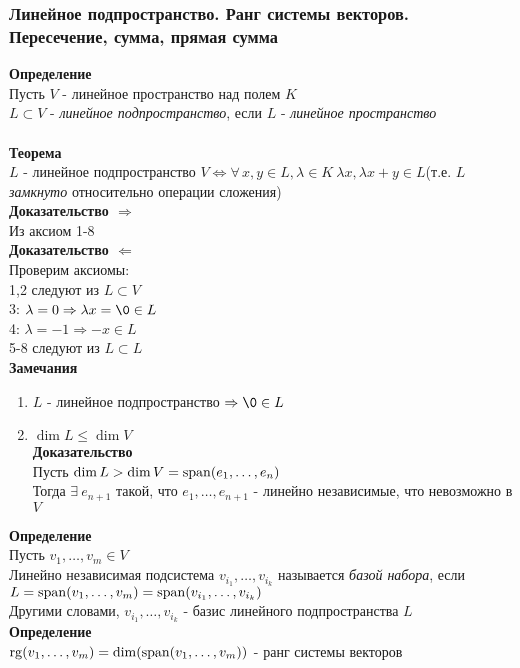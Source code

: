 \documentclass[12pt]{article}
\begin{document}
\subsubsection{Линейное подпространство. Ранг системы векторов. Пересечение, сумма, прямая сумма}
\textbf{Определение}\\
Пусть $V$ - линейное пространство над полем $K$\\
$L \subset V$ - \textit{линейное подпространство}, если $L$ - \textit{линейное пространство}\\\\
\textbf{Теорема}\\
$L$ - линейное подпространство $V \Leftrightarrow \forall\,x,y\in L, \lambda\in K\ \lambda x, \lambda x + y \in L$(т.е. $L$ \textit{замкнуто} относительно операции сложения)\\
\textbf{Доказательство $\Rightarrow$}\\
Из аксиом 1-8\\
\textbf{Доказательство $\Leftarrow$}\\
Проверим аксиомы:\\
1,2 следуют из $L \subset V$\\
3: $\lambda=0 \Rightarrow \lambda x = \0 \in L$\\
4: $\lambda = -1 \Rightarrow -x \in L$\\
5-8 следуют из $L \subset L$\\
\textbf{Замечания}
\begin{enumerate}
    \item $L$ - линейное подпространство $\Rightarrow \0 \in L$
    \item $\dim L \leq \dim V$\\
    \textbf{Доказательство}\\
    Пусть $\dim L > \dim V = \operatorname{span}(e_1,\ldots, e_n)$\\
    Тогда $\exists\ e_{n+1}$ такой, что $e_1,\ldots,e_{n+1}$ - линейно независимые, что невозможно в $V$
\end{enumerate}
\textbf{Определение}\\
Пусть $v_1,\ldots,v_m \in V$\\
Линейно независимая подсистема $v_{i_1},\ldots,v_{i_k}$ называется \textit{базой набора}, если $L = \operatorname{span}(v_1,\ldots,v_m) = \operatorname{span}(v_{i_1},\ldots,v_{i_k})$\\
Другими словами, $v_{i_1},\ldots,v_{i_k}$ - базис линейного подпространства $L$\\
\textbf{Определение}\\
$\operatorname{rg}(v_1, \ldots, v_m) = \dim (\operatorname{span}(v_1,\ldots,v_m))$ - ранг системы векторов\\\\
\end{document}
